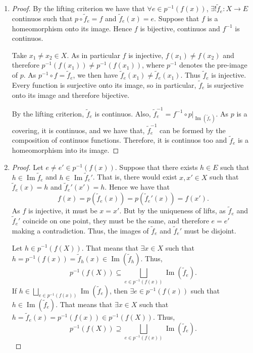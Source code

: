 \documentclass[11pt,a4paper]{article}
\newcommand{\im}{\operatorname{Im}}
\begin{document}
  \begin{enumerate}[label=\alph*)]
    \item \begin{proof} By the lifting criterion we have that $ \forall e \in p^{-1}(f(x)) $, $ \exists ! \tilde f_e \colon X \to E $ continuos such that $ p \circ \tilde f_e = f $ and $ \tilde f_e(x) = e $. Suppose that $ f $ is a homeomorphism onto its image. Hence $ f $ is bijective, continuos and $ f^{-1} $ is continuos.
    
    Take $ x_1 \neq x_2 \in X $. As in particular $ f $ is injective, $ f(x_1) \neq f(x_2) $ and therefore $ p^{-1}(f(x_1)) \neq p^{-1}(f(x_1)) $, where $p^{-1} $ denotes the pre-image of $ p $. As $ p^{-1} \circ f = \tilde f_e $, we then have $ \tilde f_e(x_1) \neq \tilde f_e(x_1) $. Thus $ \tilde f_e $ is injective. Every function is surjective onto its image, so in particular, $ \tilde f_e $ is surjective onto its image and therefore bijective.
  
    By the lifting criterion, $ \tilde f_e $ is continuos. Also, $ \tilde f_e^{-1} = f^{-1} \circ p|_{\im(\tilde f_e)} $. As $ p $ is a covering, it is continuos, and we have that, $ \tilde f_e^{-1} $ can be formed by the composition of continuos functions. Therefore, it is continuos too and $ \tilde f_e $ is a homeomorphism into its image.
    \end{proof}
  
    \item \begin{proof} Let $ e \neq e' \in p^{-1}(f(x)) $. Suppose that there exists $ h \in E $ such that $ h \in \im \tilde f_e $ and $ h \in \im \tilde f_e' $. That is, there would exist $ x, x' \in X $ such that $ \tilde f_e(x) = h $ and $ \tilde f_e'(x') = h $. Hence we have that
    $$
      f(x) = p(\tilde f_e(x)) = p(\tilde f_e'(x)) = f(x').
    $$
    As $ f $ is injective, it must be $ x = x' $. But by the uniqueness of lifts, as $ \tilde f_e $ and  $ \tilde f_e' $ coincide on one point, they must be the same, and therefore $ e = e' $ making a contradiction. Thus, the images of $ \tilde f_e $ and $ \tilde f_e' $ must be disjoint.

    Let $ h \in p^{-1} (f(X)) $. That means that $ \exists x \in X $ such that $ h = p^{-1}(f(x)) = \tilde f_h(x) \in \im(\tilde f_h)$. Thus,
    $$
      p^{-1} (f(X)) \subseteq \bigsqcup_{e \in p^{-1} (f(x))} \im(\tilde f_e).
    $$
    If $ h \in \bigsqcup_{e \in p^{-1} (f(x))} \im(\tilde f_e) $, then $ \exists e \in p^{-1} (f(x)) $ such that $ h \in \im(\tilde f_e) $. That means that $ \exists x \in X $ such that $ h = \tilde f_e(x) = p^{-1}(f(x)) \in p^{-1}(f(X)) $. Thus,
    $$
      p^{-1} (f(X)) \supseteq \bigsqcup_{e \in p^{-1} (f(x))} \im(\tilde f_e).
    $$
    \end{proof}
  \end{enumerate}
\end{document}
